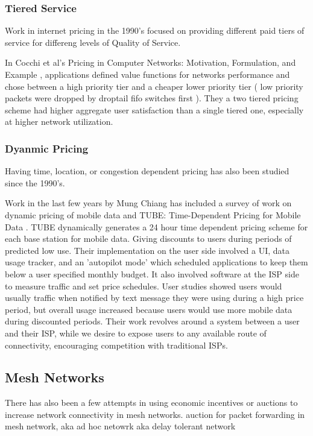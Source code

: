 \subsubsection{Tiered Service}
Work in internet pricing in the 1990's focused on providing different paid tiers of service for differeng levels of Quality of Service.

In Cocchi et al's Pricing in Computer Networks: Motivation, Formulation, and Example \cite{cocchi93}, applications defined value functions for networks performance and chose between a high priority tier and a cheaper lower priority tier ( low priority packets were dropped by droptail fifo switches first ). They a two tiered pricing scheme had higher aggregate user satisfaction than a single tiered one, especially at higher network utilization.

\subsubsection{Dyanmic Pricing}
Having time, location, or congestion dependent pricing has also been studied since the 1990's.


Work in the last few years by Mung Chiang has included a survey of work on dynamic pricing of mobile data \cite{pricingdata13} and TUBE: Time-Dependent Pricing for Mobile Data \cite{tube12}.
TUBE dynamically generates a 24 hour time dependent pricing scheme for each base station for mobile data. Giving discounts to users during periods of predicted low use.
Their implementation on the user side involved a UI, data usage tracker, and an 'autopilot mode' which scheduled applications to keep them below a user specified monthly budget. It also involved software at the ISP side to measure traffic and set price schedules.
User studies showed users would usually traffic when notified by text message they were using during a high price period, but overall usage increased because users would use more mobile data during discounted periods.
Their work revolves around a system between a user and their ISP, while we desire to expose users to any available route of connectivity, encouraging competition with traditional ISPs.

\subsection{Mesh Networks}
There has also been a few attempts in using economic incentives or auctions to increase network connectivity in mesh networks.
auction for packet forwarding in mesh network, aka ad hoc netowrk \cite{anderegg03, chen04, chen05, wang06, demir07,zhong07, kargar08, zhu08, eidenbenz08, wu10, zhong10, martignon11, martignon15} aka delay tolerant network \cite{chen13}



